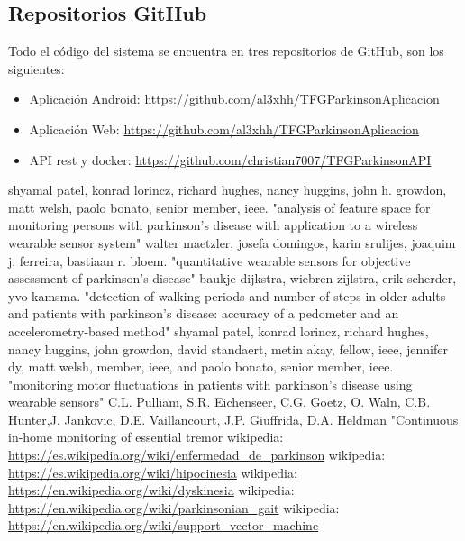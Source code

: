\subsection{Repositorios GitHub}
Todo el código del sistema se encuentra en tres repositorios de GitHub, son los siguientes:

\begin{itemize}
	\item Aplicación Android: \url {https://github.com/al3xhh/TFGParkinsonAplicacion}
    \item Aplicación Web: \url {https://github.com/al3xhh/TFGParkinsonAplicacion}
    \item API rest y docker: \url {https://github.com/christian7007/TFGParkinsonAPI}
\end{itemize}

\newpage
\begin{thebibliography}{15}
    shyamal patel, konrad lorincz, richard hughes, nancy huggins, john h. growdon, matt welsh, paolo bonato, senior member, ieee. "analysis of feature space for monitoring persons with parkinson’s disease with application to a wireless wearable sensor system"
    walter maetzler, josefa domingos, karin srulijes, joaquim j. ferreira, bastiaan r. bloem. "quantitative wearable sensors for objective assessment of parkinson’s disease"
    baukje dijkstra, wiebren zijlstra, erik scherder, yvo kamsma. "detection of walking periods and number of steps in older adults and patients with parkinson’s disease: accuracy of a pedometer and an accelerometry-based method"
    shyamal patel, konrad lorincz, richard hughes, nancy huggins, john growdon, david standaert, metin akay, fellow, ieee, jennifer dy, matt welsh, member, ieee, and paolo bonato, senior member, ieee. "monitoring motor fluctuations in patients with parkinson’s disease using wearable sensors"
    C.L. Pulliam, S.R. Eichenseer, C.G. Goetz, O. Waln, C.B. Hunter,J. Jankovic, D.E. Vaillancourt, J.P. Giuffrida, D.A. Heldman "Continuous in-home monitoring of essential tremor
     wikipedia: \url{https://es.wikipedia.org/wiki/enfermedad_de_parkinson}
     wikipedia: \url {https://es.wikipedia.org/wiki/hipocinesia}
     wikipedia: \url {https://en.wikipedia.org/wiki/dyskinesia}
     wikipedia: \url {https://en.wikipedia.org/wiki/parkinsonian_gait}
     wikipedia: \url {https://en.wikipedia.org/wiki/support_vector_machine}

\end{thebibliography}
